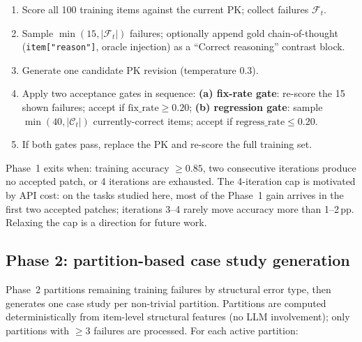 \documentclass{article}
\begin{document}
\begin{enumerate}[noitemsep,topsep=2pt]
  \item Score all 100 training items against the current PK; collect failures $\mathcal{F}_t$.
  \item Sample $\min(15,|\mathcal{F}_t|)$ failures; optionally append gold chain-of-thought
        (\texttt{item["reason"]}, oracle injection) as a ``Correct reasoning'' contrast block.
  \item Generate one candidate PK revision (temperature 0.3).
  \item Apply two acceptance gates in sequence:
        \textbf{(a) fix-rate gate}: re-score the 15 shown failures; accept if
        $\text{fix\_rate} \geq 0.20$;
        \textbf{(b) regression gate}: sample $\min(40, |\mathcal{C}_t|)$ currently-correct
        items; accept if $\text{regress\_rate} \leq 0.20$.
  \item If both gates pass, replace the PK and re-score the full training set.
\end{enumerate}

Phase~1 exits when: training accuracy $\geq 0.85$, two consecutive iterations produce no
accepted patch, or 4 iterations are exhausted.
The 4-iteration cap is motivated by API cost: on the tasks studied here, most of the
Phase~1 gain arrives in the first two accepted patches; iterations 3--4 rarely move
accuracy more than 1--2\,pp.
Relaxing the cap is a direction for future work.

\subsection{Phase 2: partition-based case study generation}
\label{sec:phase2}

Phase~2 partitions remaining training failures by structural error type, then generates one
case study per non-trivial partition.
Partitions are computed deterministically from item-level structural features (no LLM
involvement); only partitions with $\geq 3$ failures are processed.
For each active partition:
\end{document}
